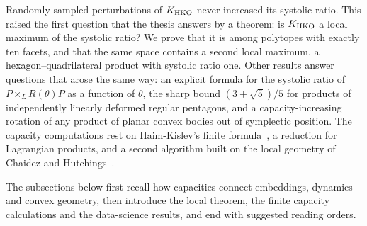 Randomly sampled perturbations of $K_{\rm HKO}$ never increased its
systolic ratio. This raised the first question that the thesis answers by
a theorem: is $K_{\rm HKO}$ a local maximum of the systolic ratio? We prove
that it is among polytopes with exactly ten facets, and that the same space
contains a second local maximum, a hexagon--quadrilateral product with
systolic ratio one. Other results answer questions that arose the same way:
an explicit formula for the systolic ratio of $P\times_L R(\theta)P$ as a
function of $\theta$, the sharp bound $(3+\sqrt5)/5$ for products of
independently linearly deformed regular pentagons, and a capacity-increasing rotation of any product of
planar convex bodies out of symplectic position. The capacity computations
rest on Haim-Kislev's finite formula~\cite{HK2017}, a reduction for
Lagrangian products, and a second algorithm built on the local geometry of
Chaidez and Hutchings~\cite{CH2021}.

The subsections below first recall how capacities connect embeddings,
dynamics and convex geometry, then introduce the local theorem, the finite
capacity calculations and the data-science results, and end with suggested
reading orders.
